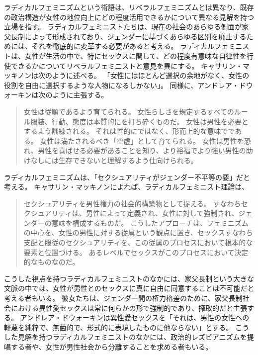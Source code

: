 \documentclass[paper=a4,book,openany]{jlreq} \usepackage{mystyle}
\begin{document}
ラディカルフェミニズムという術語は、リベラルフェミニズムとは異なり、既存の政治構造が女性の地位向上にどの程度活用できるかについて異なる見解を持つ立場を指す。
ラディカルフェミニストたちは、現在の社会のあらゆる側面が家父長制によって形成されており、ジェンダーに基づくあらゆる区別を廃止するためには、それを徹底的に変革する必要があると考える。
ラディカルフェミニストは、女性が生活の中で、特にセックスに関して、どの程度有意味な自律性を行使できるかについてリベラルフェミニストと意見を異にする。
キャサリン・マッキノンは次のように述べる。
「女性にはほとんど選択の余地がなく、女性の役割を自由に選択するような人物になるしかない」\citep[p.124]{mackinnon89:_towar_femin_theor_of_state}。
同様に、アンドレア・ドウォーキンは次のように主張する。

\begin{quote}
  女性は従順であるよう育てられる。
女性らしさを規定するすべてのルール{\DDASH}服装、行動、態度{\DDASH}は本質的にを打ち砕くものだ。
女性は男性を必要とするよう訓練される。
それは性的にではなく、形而上的な意味でである。
女性は満たされるべき「空虚」として育てられる。
女性は男性を恐れ、男性を喜ばせる必要があることを知り、より裕福でより強い男性の助けなしには生存できないと理解するよう仕向けられる。
\citep[p.81]{dworkin83:_righ_wing_women}
\end{quote}

ラディカルフェミニズムは、「セクシュアリティがジェンダー不平等の要」だと考える。
キャサリン・マッキノンによれば、ラディカルフェミニスト理論は、
\begin{quote}
セクシュアリティを男性権力の社会的構築物として捉える。
すなわちセクシュアリティは、男性によって定義され、女性に対して強制され、ジェンダーの意味を構成するものだ。
こうしたアプローチは、フェミニズムの中心を、女性の男性に対する従属という観点に置き、セックス{\DDASH}すなわち支配と服従のセクシュアリティ{\DDASH}を、この従属のプロセスにおいて根本的な要素と位置づける。
あるレベルでセックスがこのプロセスにおいて決定的なものなのだ。
\citep[p.128]{mackinnon89:_towar_femin_theor_of_state}
\end{quote}

こうした視点を持つラディカルフェミニストのなかには、家父長制という大きな文脈の中では、女性が男性とのセックスに真に自由に同意することは不可能だと考える者もいる。
彼女たちは、ジェンダー間の権力格差のために、家父長制社会における異性愛セックスは常に何らかの形で強制的であり、搾取的だと主張する。
アンドレア・ドウォーキンは異性愛セックスを「それは、男性の女性への軽蔑を純粋で、無菌的で、形式的に表現したものに他ならない」とする\citep[p.138]{dworkin87:_inter}。
こうした見解を持つラディカルフェミニストのなかには、政治的レズビアニズムを提唱する者や、女性が男性社会から分離することを求める者もいる。
\end{document}
